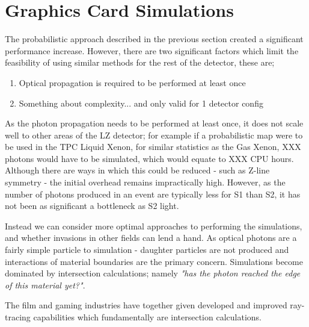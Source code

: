 \section{Graphics Card Simulations}

\par
The probabilistic approach described in the previous section created a significant performance increase. 
However, there are two significant factors which limit the feasibility of using similar methods for the rest of the detector, these are;
\begin{enumerate}
    \item Optical propagation is required to be performed at least once
    \item Something about complexity... and only valid for 1 detector config
\end{enumerate}
As the photon propagation needs to be performed at least once, it does not scale well to other areas of the LZ detector; for example if a probabilistic map were to be used in the TPC Liquid Xenon, for similar statistics as the Gas Xenon, XXX photons would have to be simulated, which would equate to XXX CPU hours.
Although there are ways in which this could be reduced - such as Z-line symmetry - the initial overhead remains impractically high.
However, as the number of photons produced in an event are typically less for S1 than S2, it has not been as significant a bottleneck as S2 light.

\par
Instead we can consider more optimal approaches to performing the simulations, and whether invasions in other fields can lend a hand.
As optical photons are a fairly simple particle to simulation - daughter particles are not produced and interactions of material boundaries are the primary concern.
Simulations become dominated by intersection calculations; namely \textit{"has the photon reached the edge of this material yet?"}.

\par
The film and gaming industries have together given developed and improved ray-tracing capabilities which fundamentally are intersection calculations.


